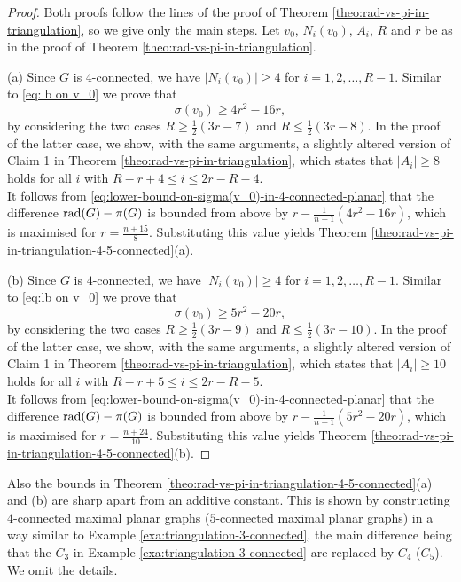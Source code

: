 \documentclass[a4paper,11pt]{article}
\begin{document}
\begin{proof}
Both proofs follow the lines of the proof of Theorem \ref{theo:rad-vs-pi-in-triangulation}, so 
we give only the main steps. 
Let $v_0$, $N_i(v_0)$, $A_i$, $R$ and $r$ 
be as in the proof of Theorem \ref{theo:rad-vs-pi-in-triangulation}.  

(a) Since $G$ is $4$-connected, we have $|N_i(v_0)| \geq 4$ for $i=1,2,\ldots,R-1$. 
Similar to \eqref{eq:lb on v_0} we prove that 
\begin{equation}  \label{eq:lower-bound-on-sigma(v_0)-in-4-connected-planar} 
\sigma(v_0) \geq 4r^2 - 16r, 
\end{equation}
by considering the two cases $R \geq \frac{1}{2}(3r-7)$ and $R \leq \frac{1}{2}(3r-8)$. 
In the proof of the latter case, we show, with the same arguments, a slightly altered 
version of Claim 1 in 
Theorem \ref{theo:rad-vs-pi-in-triangulation}, which states that $|A_i| \geq 8$ holds
for all $i$ with $R-r+4 \leq i \leq 2r-R-4$. \\
It follows from  \eqref{eq:lower-bound-on-sigma(v_0)-in-4-connected-planar} that
the difference ${\rm rad}(G) - \pi(G)$ is bounded from above by $r - \frac{1}{n-1}(4r^2 - 16r)$,
which is maximised for $r=\frac{n+15}{8}$. Substituting this value yields 
Theorem \ref{theo:rad-vs-pi-in-triangulation-4-5-connected}(a). 

(b) Since $G$ is $4$-connected, we have $|N_i(v_0)| \geq 4$ for $i=1,2,\ldots,R-1$. 
Similar to \eqref{eq:lb on v_0} we prove that 
\begin{equation}  \label{eq:lower-bound-on-sigma(v_0)-in-5-connected-planar} 
\sigma(v_0) \geq 5r^2 - 20r, 
\end{equation}
by considering the two cases $R \geq \frac{1}{2}(3r-9)$ and $R \leq \frac{1}{2}(3r-10)$. 
In the proof of the latter case, we show, with the same arguments, a slightly altered 
version of Claim 1 in 
Theorem \ref{theo:rad-vs-pi-in-triangulation}, which states that $|A_i| \geq 10$ holds
for all $i$ with $R-r+5 \leq i \leq 2r-R-5$. \\
It follows from  \eqref{eq:lower-bound-on-sigma(v_0)-in-4-connected-planar} that
the difference ${\rm rad}(G) - \pi(G)$ is bounded from above by $r - \frac{1}{n-1}(5r^2 - 20r)$,
which is maximised for $r=\frac{n+24}{10}$. Substituting this value yields 
Theorem \ref{theo:rad-vs-pi-in-triangulation-4-5-connected}(b).  
\end{proof}

Also the bounds in Theorem \ref{theo:rad-vs-pi-in-triangulation-4-5-connected}(a) and (b) 
are sharp apart from an additive constant. This is shown by constructing $4$-connected
maximal planar graphs ($5$-connected maximal planar graphs) in a way similar to 
Example \ref{exa:triangulation-3-connected}, the main difference being that the 
$C_3$ in Example \ref{exa:triangulation-3-connected} are replaced by $C_4$ ($C_5$). We omit the details. \\
\end{document}
